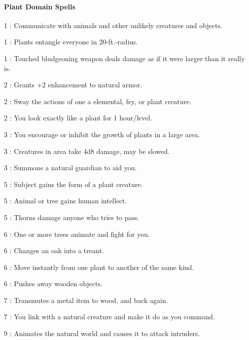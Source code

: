 \paragraph{Plant Domain Spells}
\begin{list}{}{\leftmargin=1em}
\item[1] : Communicate with animals and other unlikely creatures and objects.
\item[1] : Plants entangle everyone in 20-ft.-radius.
\item[1] : Touched bludgeoning weapon deals damage as if it were larger than it really is.
\item[2] : Grants +2 enhancement to natural armor.
\item[2] : Sway the actions of one a elemental, fey, or plant creature.
\item[2] : You look exactly like a plant for 1 hour/level.
\item[3] : You encourage or inhibit the growth of plants in a large area.
\item[3] : Creatures in area take 4d8 damage, may be slowed.
\item[3] : Summons a natural guardian to aid you.
\item[5] : Subject gains the form of a plant creature.
\item[5] : Animal or tree gains human intellect.
\item[5] : Thorns damage anyone who tries to pass.
\item[6] : One or more trees animate and fight for you.
\item[6] : Changes an oak into a treant.
\item[6] : Move instantly from one plant to another of the same kind.
\item[6] : Pushes away wooden objects.
\item[7] : Transmutes a metal item to wood, and back again.
\item[7] : You link with a natural creature and make it do as you command.
\item[9] : Animates the natural world and causes it to attack intruders.
\end{list}
